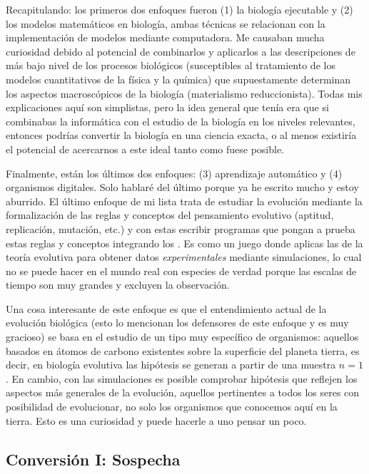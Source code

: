 \documentclass[12pt]{article}
\begin{document}
	Recapitulando: los primeros dos enfoques fueron (1) la biología
	ejecutable y (2) los modelos matemáticos en biología, ambas técnicas
	se relacionan con la implementación de modelos mediante computadora. Me
	causaban mucha curiosidad debido al potencial de combinarlos y
	aplicarlos a las descripciones de más bajo nivel de los procesos
	biológicos (susceptibles al tratamiento de los modelos cuantitativos de
	la física y la química) que supuestamente determinan los aspectos
	macroscópicos de la biología (materialismo reduccionista). Todas mis
	explicaciones aquí son simplistas, pero la idea general que tenía era
	que si combinabas la informática con el estudio de la biología en los
	niveles relevantes, entonces podrías convertir la biología en una
	ciencia exacta, o al menos existiría el potencial de acercarnos a este
	ideal tanto como fuese posible.

	Finalmente, están los últimos dos enfoques: (3) aprendizaje automático y
	(4) organismos digitales. Solo hablaré del último porque ya he escrito
	mucho y estoy aburrido. El último enfoque de mi lista trata de estudiar
	la evolución mediante la formalización de las reglas y conceptos del
	pensamiento evolutivo (aptitud, replicación, mutación, etc.) y con estas
	escribir programas que pongan a prueba estas reglas y conceptos
	integrando los . Es como un juego
	donde aplicas las  de la teoría evolutiva para obtener
	datos \textit{experimentales} mediante simulaciones, lo cual no se puede
	hacer en el mundo real con especies de verdad porque las escalas de
	tiempo son muy grandes y excluyen la observación.

	Una cosa interesante de este
	enfoque es que el entendimiento actual de la evolución biológica (esto
	lo mencionan los defensores de este enfoque y es muy gracioso) se basa
	en el estudio de un tipo muy específico de organismos: aquellos basados
	en átomos de carbono existentes sobre la superficie del planeta tierra,
	es decir, en biología evolutiva las hipótesis se generan a partir de una
	muestra $n=1$. En cambio, con las simulaciones es posible comprobar
	hipótesis que reflejen los aspectos más generales de la evolución,
	aquellos pertinentes a todos los seres con posibilidad de evolucionar,
	no solo los organismos que conocemos aquí en la tierra. Esto es una
	curiosidad y puede hacerle a uno pensar un poco.

	\newpage

	\subsection{Conversión I: Sospecha}
\end{document}
